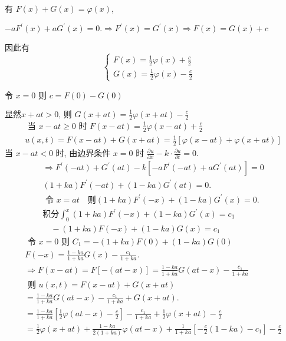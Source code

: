 \begin{questions}
\begin{solution}
有 $ F(x)+G(x)=\varphi (x) $,

$
-a F^{\prime}(x)+a G^{\prime}(x)=0 . \Rightarrow F^{\prime}(x)=G^{\prime}(x) \Rightarrow F(x)=G(x)+c 
$

因此有 
$$ \left\{\begin{array}{l}F(x)=\frac{1}{2} \varphi (x)+\frac{c}{2} \\ G(x)=\frac{1}{2} \varphi (x)-\frac{c}{2}\end{array} \quad\right. $$ 

令 $ x=0 $ 则 $ c=F(0)-G(0) $ 

$
\text {显然} x+a t > 0 \text {, 则 } G(x+a t)=\frac{1}{2} \varphi(x+a t)-\frac{c}{2}
$
$$
\begin{array}{l}
	\text { 当 } x -at \geqslant 0 \text { 时 } F(x-a t)=\frac{1}{2} \varphi(x-a t)+\frac{c}{2} \\
	u(x, t)=F(x-a t)+G(x+a t)=\frac{1}{2}[\varphi(x-a t)+\varphi(x+a t)]
\end{array}
$$
当 $ x-a t<0 $ 时,
由边界条件 $ x=0 $ 时 $ \frac{\partial u}{\partial x}-k \cdot \frac{\partial u}{\partial t}=0 $.
$$
\begin{array}{l}
	\Rightarrow F^{\prime}(-a t)+G^{\prime}(a t)-k\left[-a F^{\prime}(-a t)+a G^{\prime}(a t)\right]=0 \\
	(1+k a) F^{\prime}(-a t)+(1-k a) G^{\prime}(a t)=0 . \\
	\text { 令 } x=a t \quad  \text{则}(1+k a) F^{\prime}(-x)+(1-k a) G^{\prime}(x)=0 . \\
	\text{积分} \int_{0}^{x}(1+k a) F^{\prime}(-x)+(1-k a) G^{\prime}(x)=c_{1} \\
	\quad-(1+k a) F(-x)+(1-k a) G(x)=c_{1}
\end{array}
$$
$$ \begin{array}{l}\text { 令 } x=0 \text { 则 } C_{1}=-(1+k a) F(0)+(1-k a) G(0)  \\ F(-x)=\frac{1-k a}{1+k a} G(x)-\frac{c_{1}}{1+k a} \text {. } \\ \Rightarrow F(x-a t)=F[-(a t-x)]=\frac{1-k a}{1+k a} G(a t-x)-\frac{c_{1}}{1+k a} \\ \text { 则 } u(x, t)=F(x-a t)+G(x+a t) \\ =\frac{1-k a}{1+k a} G(a t-x)-\frac{c_{1}}{1+k a}+G(x+a t) \text {. } \\ =\frac{1-k a}{1+k a}\left[\frac{1}{2} \varphi(a t-x)-\frac{c}{2}\right]-\frac{c_1}{1+k a}+\frac{1}{2} \varphi(x+a t)-\frac{c}{2} \\ =\frac{1}{2} \varphi(x+a t)+\frac{1-k a}{2(1+k a)} \varphi(a t-x)+\frac{1}{1+k a}\left[-\frac{c}{2}(1-k a)-c_{1}\right]-\frac{c}{2} \end{array} $$

\end{solution}
\end{questions}
